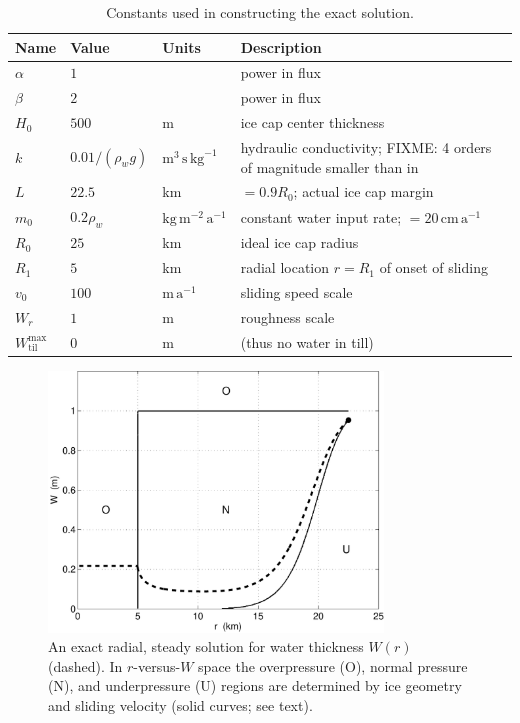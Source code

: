 \documentclass[11pt,final]{amsart}
\newcommand{\Wtilmax}{W_{\text{til}}^{\text{max}}}
\begin{document}
\begin{table}[ht]
  \centering
  \caption{Constants used in constructing the exact solution.}
  \begin{tabular}{lllp{3.0in}}
    \textbf{Name} & \textbf{Value} & \textbf{Units} & \textbf{Description}\\
\hline
    $\alpha$ & $1$ & & power in flux \\
    $\beta$  & $2$ & & power in flux \\
    $H_0$ & $500$ & m & ice cap center thickness \\
    $k$   & $0.01/(\rho_w g)$ & $\text{m}^3\,\text{s}\,\text{kg}^{-1}$ & hydraulic conductivity; FIXME: 4 orders of magnitude smaller than in \cite{Hewittetal2012} \\
    $L$   & $22.5$& km & $=0.9 R_0$; actual ice cap margin \\
    $m_0$ & $0.2\rho_w$ & $\text{kg}\,\text{m}^{-2}\,\text{a}^{-1}$ & constant water input rate; $= 20 \,\text{cm}\,\text{a}^{-1}$ \\
    $R_0$ & $25$  & km & ideal ice cap radius \\
    $R_1$ & $5$   & km & radial location $r=R_1$ of onset of sliding \\
    $v_0$ & $100$ & $\text{m}\,\text{a}^{-1}$ & sliding speed scale \\
    $W_r$ & $1$ & m & roughness scale \\
    $\Wtilmax$ & 0 & m & (thus no water in till) \\
    \hline
  \end{tabular}
 \label{tab:verifconstants}
\end{table}

\begin{figure}[ht]
\includegraphics[width=3.5in,keepaspectratio=true]{exact-W-plot-onu}
\caption{An exact radial, steady solution for water thickness $W(r)$ (dashed).  In $r$-versus-$W$ space the overpressure (O), normal pressure (N), and underpressure (U) regions are determined by ice geometry and sliding velocity (solid curves; see text).}
\label{fig:Wexact}
\end{figure}
\end{document}

